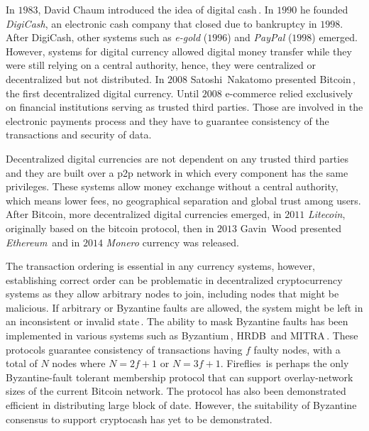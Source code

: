 \documentclass[USenglish]{uit-thesis}
\begin{document}
In $1983$, David Chaum introduced the idea of
digital cash\,\cite{chaum83blindsign}. In $1990$ he founded \emph{DigiCash},
an electronic cash company that closed due to bankruptcy in
$1998$. After DigiCash, other systems such as \emph{e-gold} ($1996$) and
\emph{PayPal} ($1998$) emerged. However, systems for digital currency allowed
digital money transfer while they were still relying on a central authority,
hence, they were centralized or decentralized but not distributed.
In $2008$ Satoshi~Nakatomo presented Bitcoin\,\cite{Nakamoto_bitcoin},
the first decentralized digital currency.
Until $2008$ e-commerce relied exclusively on financial institutions
serving as trusted third parties. Those are involved in the electronic
payments process and they have to guarantee consistency of the
transactions and security of data.

Decentralized digital currencies are not
dependent on any trusted third parties and they are built over a
\gls{p2p} network in which every component has the same
privileges. These systems allow money exchange
without a central authority, which means lower fees, no geographical
separation and global trust among users. After Bitcoin,
more decentralized digital currencies emerged, in $2011$ \emph{Litecoin},
originally based on the bitcoin protocol, then in $2013$
Gavin~Wood presented \emph{Ethereum}\,\cite{ethereum} and in
$2014$ \emph{Monero} currency was released.

The transaction ordering is essential in any currency systems,
however, establishing correct order can be problematic in
decentralized cryptocurrency systems as they allow 
arbitrary nodes to join, including nodes that might be malicious.
If arbitrary or Byzantine faults are allowed,
the system might be left in an inconsistent or invalid state\,\cite{Lamport1982}.
The ability to mask Byzantine faults has been implemented in various systems such as
Byzantium\,\cite{Garcia:2011:EMB}, HRDB\,\cite{vandiver2007hrdb} and MITRA\,\cite{Luiz:2014:MBF}.
These protocols guarantee consistency of transactions having
$f$ faulty nodes, with a total of $N$ nodes where $N=2f+1$ or $N=3f+1$.
Fireflies\,\cite{Johansen2015Fireflies} is perhaps the only Byzantine-fault
tolerant membership protocol that can support overlay-network sizes
of the current Bitcoin network. The protocol has also been demonstrated
efficient in distributing large block of date. %
However, the suitability of Byzantine consensus to
support cryptocash has yet to be demonstrated.
\end{document}
